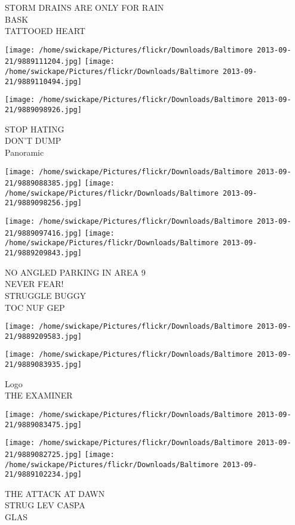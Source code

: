 \documentclass[10pt,letterpaper]{article}
\begin{document}
STORM DRAINS ARE ONLY FOR RAIN\\
BASK\\
TATTOOED HEART
\pagebreak

\texttt{[image: /home/swickape/Pictures/flickr/Downloads/Baltimore 2013-09-21/9889111204.jpg]}
\texttt{[image: /home/swickape/Pictures/flickr/Downloads/Baltimore 2013-09-21/9889110494.jpg]}

\vspace{0.25in}
\texttt{[image: /home/swickape/Pictures/flickr/Downloads/Baltimore 2013-09-21/9889098926.jpg]}

STOP HATING\\
DON'T DUMP\\
Panoramic
\pagebreak

\texttt{[image: /home/swickape/Pictures/flickr/Downloads/Baltimore 2013-09-21/9889088385.jpg]}
\texttt{[image: /home/swickape/Pictures/flickr/Downloads/Baltimore 2013-09-21/9889098256.jpg]}

\texttt{[image: /home/swickape/Pictures/flickr/Downloads/Baltimore 2013-09-21/9889097416.jpg]}
\texttt{[image: /home/swickape/Pictures/flickr/Downloads/Baltimore 2013-09-21/9889209843.jpg]}

NO ANGLED PARKING IN AREA 9\\
NEVER FEAR!\\
STRUGGLE BUGGY\\
TOC NUF GEP
\pagebreak

\texttt{[image: /home/swickape/Pictures/flickr/Downloads/Baltimore 2013-09-21/9889209583.jpg]}

\vspace{0.25in}
\texttt{[image: /home/swickape/Pictures/flickr/Downloads/Baltimore 2013-09-21/9889083935.jpg]}

Logo\\
THE EXAMINER
\pagebreak

\texttt{[image: /home/swickape/Pictures/flickr/Downloads/Baltimore 2013-09-21/9889083475.jpg]}

\vspace{0.25in}
\texttt{[image: /home/swickape/Pictures/flickr/Downloads/Baltimore 2013-09-21/9889082725.jpg]}
\texttt{[image: /home/swickape/Pictures/flickr/Downloads/Baltimore 2013-09-21/9889102234.jpg]}

THE ATTACK AT DAWN\\
STRUG LEV CASPA\\
GLAS
\pagebreak
\end{document}
